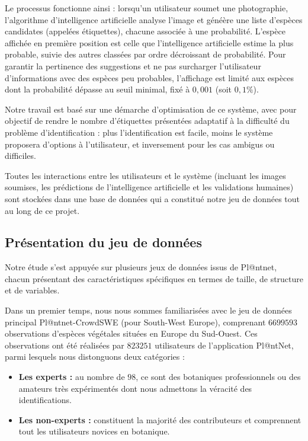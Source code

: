 \documentclass[a4paper,12pt]{article}
\begin{document}
Le processus fonctionne ainsi : lorsqu'un utilisateur soumet une photographie, l'algorithme d'intelligence artificielle analyse l'image et généère une liste d'espèces candidates (appelées étiquettes), chacune associée à une probabilité. L'espèce affichée en première position est celle que l'intelligence artificielle estime la plus probable, suivie des autres classées par ordre décroissant de probabilité. Pour garantir la pertinence des suggestions et ne pas surcharger l'utilisateur d'informations avec des espèces peu probables, l'affichage est limité aux espèces dont la probabilité dépasse au seuil minimal, fixé à $0,001$ (soit $0,1\%$).

\vspace{0.2cm}


Notre travail est basé sur une démarche d'optimisation de ce système, avec pour objectif de rendre le nombre d'étiquettes présentées adaptatif à la difficulté du problème d'identification : plus l'identification est facile, moins le système proposera d'options à l'utilisateur, et inversement pour les cas ambigus ou difficiles.

\vspace{0.2cm}

Toutes les interactions entre les utilisateurs et le système (incluant les images soumises, les prédictions de l'intelligence artificielle et les validations humaines) sont stockées dans une base de données qui a constitué notre jeu de données tout au long de ce projet.


\subsection{Présentation du jeu de données}

Notre étude s'est appuyée sur plusieurs jeux de données issus de Pl@ntnet, chacun présentant des caractéristiques spécifiques en termes de taille, de structure et de variables.

\vspace{0.2cm}

Dans un premier temps, nous nous sommes familiarisées avec le jeu de données principal Pl@ntnet-CrowdSWE (pour South-West Europe), comprenant $\num{6 699 593}$ observations d'espèces végétales situées en Europe du Sud-Ouest. Ces observations ont été réalisées par $\num{823 251}$ utilisateurs de l'application Pl@ntNet, parmi lesquels nous distonguons deux catégories : 
\begin{itemize}
    \item \textbf{Les experts :} au nombre de $98$, ce sont des botaniques professionnels ou des amateurs très expérimentés dont nous admettons la véracité des identifications.
    \item \textbf{Les non-experts :} constituent la majorité des contributeurs et comprennent tout les utilisateurs novices en botanique.
\end{itemize}
\end{document}
